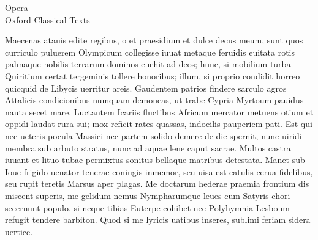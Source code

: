 \documentclass{book}
\newenvironment {carmen} [1] [\relax] 
  {\Titulus \Versus \incipit*\numerus{1}#1}
  {\endVersus}
\begin{document}
              {Opera\\[.75ex]Oxford Classical Texts}



\pagestyle {MainMatterPage} 
\thispagestyle{empty}

 \Liber

\Indexes

\begin{carmen}
 Maecenas atauis edite regibus,
 o et praesidium et dulce decus meum,
 sunt quos curriculo puluerem Olympicum
 collegisse iuuat metaque feruidis
 euitata rotis palmaque nobilis               
 terrarum dominos euehit ad deos;
 hunc, si mobilium turba Quiritium
 certat tergeminis tollere honoribus;
 illum, si proprio condidit horreo
 quicquid de Libycis uerritur areis.               
 Gaudentem patrios findere sarculo
 agros Attalicis condicionibus
 numquam demoueas, ut trabe Cypria
 Myrtoum pauidus nauta secet mare.
 Luctantem Icariis fluctibus Africum               
 mercator metuens otium et oppidi
 laudat rura sui; mox reficit rates
 quassas, indocilis pauperiem pati.
 Est qui nec ueteris pocula Massici
 nec partem solido demere de die               
 spernit, nunc uiridi membra sub arbuto
 stratus, nunc ad aquae lene caput sacrae.
 Multos castra iuuant et lituo tubae
 permixtus sonitus bellaque matribus
 detestata. Manet sub Ioue frigido               
 uenator tenerae coniugis inmemor,
 seu uisa est catulis cerua fidelibus,
 seu rupit teretis Marsus aper plagas.
 Me doctarum hederae praemia frontium
 dis miscent superis, me gelidum nemus               
 Nympharumque leues cum Satyris chori
 secernunt populo, si neque tibias
 Euterpe cohibet nec Polyhymnia
 Lesboum refugit tendere barbiton.
 Quod si me lyricis uatibus inseres,               
 sublimi feriam sidera uertice. 
\end{carmen}
\end{document}

